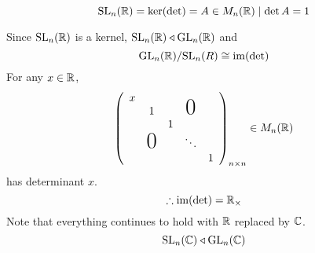 \documentclass{article}
\begin{document}
\begin{defi}
    \[
        \mathrm{SL}_n(\mathbb{R}) = \ker(\det) = {A \in M_n(\mathbb{R}) \mid \det A = 1}  
    \]
\end{defi}
\begin{remark}
    Since $\mathrm{SL}_n(\mathbb{R})$ is a kernel, $\mathrm{SL}_n(\mathbb{R}) \triangleleft \mathrm{GL}_n(\mathbb{R})$ and
    \[
        \mathrm{GL}_n(\mathbb{R}) / \mathrm{SL}_n(R) \cong \operatorname{im}(\det)
    \]
    For any $x \in \mathbb{R}$,
    \[
        \bkt{
            \begin{array}{ccccc}
                x                                                    \\
                  & 1                     &  & \smash{\text{\huge0}} \\
                  &                       & 1                        \\
                  & \smash{\text{\huge0}} &   & \ddots               \\
                  &                       &   &   & 1
            \end{array}
        }_{n \times n} \in M_n(\R)
    \]
    has determinant $x$.
    \[
        \therefore \operatorname{im}(\det) = \mathbb{R}_\times
    \]
    Note that everything continues to hold with $\mathbb{R}$ replaced by $\mathbb{C}$.
    \[
        \mathrm{SL}_n(\mathbb{C}) \triangleleft \mathrm{GL}_n(\mathbb{C})
    \]
\end{remark}

\end{document}
